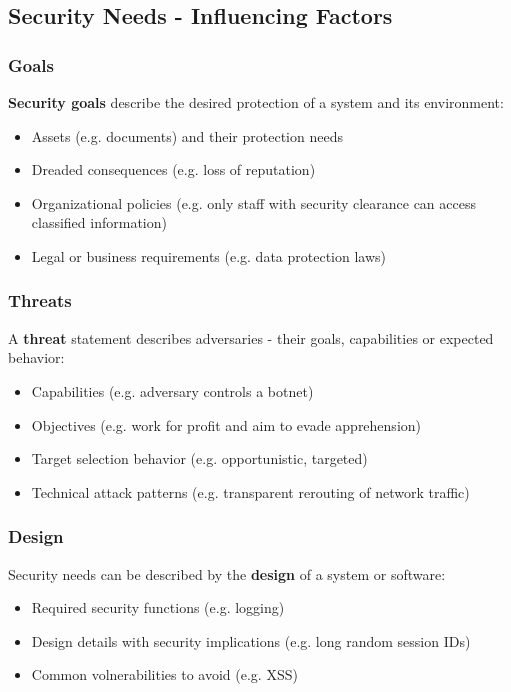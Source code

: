 \documentclass[12pt,A4]{extarticle}
\newcommand{\highlight}[1]{\textcolor{highlightColor}{\textbf{#1}}}
\begin{document}
\subsection{Security Needs - Influencing Factors}
\subsubsection{Goals}
\highlight{Security goals} describe the desired protection of a system and its environment:
\begin{itemize}
  \item{Assets (e.g. documents) and their protection needs}
  \item{Dreaded consequences (e.g. loss of reputation)}
  \item{Organizational policies (e.g. only staff with security clearance can access classified information)}
  \item{Legal or business requirements (e.g. data protection laws)}
\end{itemize}

\subsubsection{Threats}
A \highlight{threat} statement describes adversaries - their goals, capabilities or expected behavior:
\begin{itemize}
  \item{Capabilities (e.g. adversary controls a botnet)}
  \item{Objectives (e.g. work for profit and aim to evade apprehension)}
  \item{Target selection behavior (e.g. opportunistic, targeted)}
  \item{Technical attack patterns (e.g. transparent rerouting of network traffic)}
\end{itemize} 

\subsubsection{Design}
Security needs can be described by the \highlight{design} of a system or software:
\begin{itemize}
  \item{Required security functions (e.g. logging)}
  \item{Design details with security implications (e.g. long random session IDs)}
  \item{Common volnerabilities to avoid (e.g. XSS)}
\end{itemize}
\end{document}
